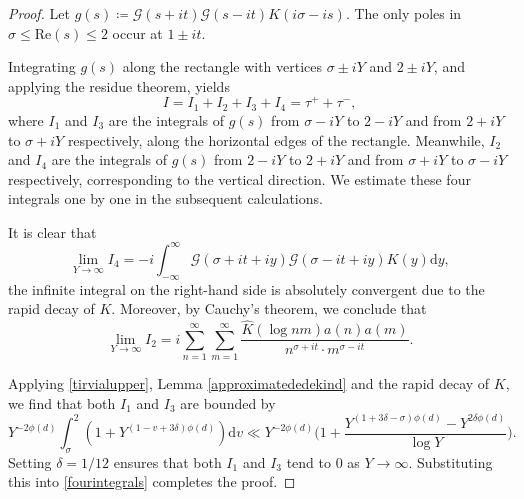 \documentclass[10pt,a4paper]{amsart}
\newcommand{\mcg}{\mathcal{G}}
\begin{document}
\begin{proof}
    Let $g(s) \coloneqq  \mcg(s + it )\mcg(s - it)K(i\sigma - is)$. The only poles in $\sigma \le {\textrm{Re}}(s) \le 2$ occur at $1 \pm it$.
    \par
    Integrating $g(s)$ along the rectangle with vertices $\sigma \pm iY$ and $2 \pm iY$, and applying the residue theorem, yields
    \begin{equation}
        \label{fourintegrals}
            I = I_1 + I_2 + I_3 + I_4 = \tau^{+} + \tau^{-},
    \end{equation}
    where $I_1$ and $I_3$ are the integrals of $g(s)$ from $\sigma - iY$ to $2 - iY$ and from $2 + iY$ to $\sigma + iY$ respectively, along the horizontal edges of the rectangle. Meanwhile, $I_2$ and $I_4$ are the integrals of $g(s)$ from $2 - iY$ to $2 + iY$ and from $\sigma + iY$ to $\sigma - iY$ respectively, corresponding to the vertical direction. We estimate these four integrals one by one in the subsequent calculations.
    \par
    It is clear that 
    $$
    \lim_{Y \to \infty} I_4 = -i \int_{-\infty}^{\infty} \mcg(\sigma + it + iy)\mcg(\sigma - it + iy)K(y)\mathrm{d}y,
    $$
    the infinite integral on the right-hand side is absolutely convergent due to the rapid decay of $K$. Moreover, by Cauchy's theorem, we conclude that
    $$
    \lim_{Y \to \infty} I_2 = i \sum_{n = 1}^{\infty} \sum_{m = 1}^{\infty}  \frac{\widehat{K}(\log nm)a(n)a(m)}{n^{\sigma + it} \cdot m^{\sigma - it}}.
    $$
    \par
    Applying \eqref{tirvialupper}, Lemma \ref{approximatededekind} and the rapid decay of $K$, we find that both $I_1$ and $I_3$ are bounded by
    $$
   Y^{-2 \phi(d)}\int_{\sigma}^{2} (1 + Y^{(1 - v + 3\delta)\phi(d)}) \mathrm{d}v \ll Y^{-2 \phi(d)} \Big( 1 + \frac{Y^{(1 + 3\delta - \sigma)\phi(d)} - Y^{2\delta\phi(d)}}{\log Y} \Big).
    $$
    Setting $\delta = 1/12$ ensures that both $I_1$ and $I_3$ tend to $0$ as $Y \to \infty$. Substituting this into \eqref{fourintegrals} completes the proof. 
\end{proof}
\end{document}

